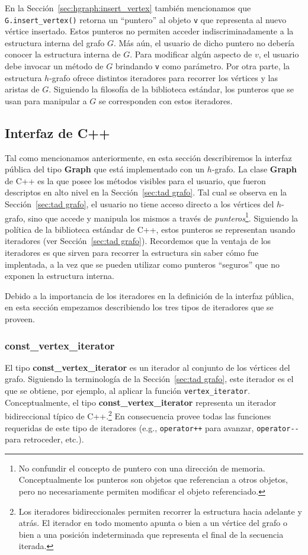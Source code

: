 \documentclass[%
    a4paper,%
    12pt,%
    twoside,%
    openright,%
    halfparskip,%
    cleardoubleempty,%
    bigheadings,%
    titlepage,%
    headsepline%
]{scrbook}
\makeatletter
\newcommand{\Code}[1]{\lstinline[basicstyle={\tt}]@#1@}
\makeatother
\begin{document}
En la Sección~\ref{sec:hgraph:insert_vertex} también mencionamos que \texttt{G.insert\_vertex()} retorna un ``puntero'' al objeto \texttt{v} que representa al nuevo vértice insertado.  Estos punteros no permiten acceder indiscriminadamente a la estructura interna del grafo $G$.  Más aún, el usuario de dicho puntero no debería conocer la estructura interna de $G$.  Para modificar algún aspecto de $v$, el usuario debe invocar un método de $G$ brindando \texttt{v} como parámetro.  Por otra parte, la estructura $h$-grafo ofrece distintos iteradores para recorrer los vértices y las aristas de $G$.  Siguiendo la filosofía de la biblioteca estándar, los punteros que se usan para manipular a $G$ se corresponden con estos iteradores.

\subsection{Interfaz de C++}
\label{sec:c++:interfaz}
Tal como mencionamos anteriormente, en esta sección describiremos la interfaz pública del tipo \textbf{Graph} que está implementado con un $h$-grafo.  La clase \textbf{Graph} de C++ es la que posee los métodos visibles para el usuario, que fueron descriptos en alto nivel en la Sección~\ref{sec:tad grafo}.
Tal cual se observa en la Sección~\ref{sec:tad grafo}, el usuario no tiene acceso directo a los vértices del $h$-grafo, sino que accede y manipula los mismos a través de \emph{punteros}\footnote{No confundir el concepto de puntero con una dirección de memoria.  Conceptualmente los punteros son objetos que referencian a otros objetos, pero no necesariamente permiten modificar el objeto referenciado.}.  Siguiendo la política de la biblioteca estándar de C++, estos punteros se representan usando iteradores (ver Sección~\ref{sec:tad grafo}).
Recordemos que la ventaja de los iteradores es que sirven para recorrer la estructura sin saber cómo fue implentada, a la vez que se pueden utilizar como punteros ``seguros'' que no exponen la estructura interna.

Debido a la importancia de los iteradores en la definición de la interfaz pública, en esta sección empezamos describiendo los tres tipos de iteradores que se proveen.

\subsubsection{const\_vertex\_iterator}
\label{sec:vertex iterator}

El tipo \textbf{const\_vertex\_iterator} es un iterador al conjunto de los vértices del grafo.  Siguiendo la terminología de la Sección~\ref{sec:tad grafo}, este iterador es el que se obtiene, por ejemplo, al aplicar la función \Code{vertex_iterator}.  Conceptualmente, el tipo \textbf{const\_vertex\_iterator} representa un iterador bidireccional típico de C++.\footnote{Los iteradores bidireccionales permiten recorrer la estructura hacia adelante y atrás.  El iterador en todo momento apunta o bien a un vértice del grafo o bien a una posición indeterminada que representa el final de la secuencia iterada.}  En consecuencia provee todas las funciones requeridas de este tipo de iteradores (e.g., \Code{operator++} para avanzar, \Code{operator--} para retroceder, etc.).  
\end{document}
